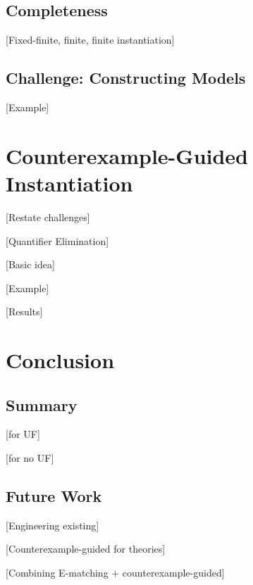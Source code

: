 \documentclass[oribibl]{llncs}
\begin{document}
\subsection{Completeness}

[Fixed-finite, finite, finite instantiation]

\subsection{Challenge: Constructing Models}

[Example]

\section{Counterexample-Guided Instantiation}
\label{sec:cegqi}

[Restate challenges]

[Quantifier Elimination]

[Basic idea]

[Example]

[Results]

\section{Conclusion}
\label{sec:conclusion}

\subsection{Summary}
[for UF]

[for no UF]

\subsection{Future Work}

[Engineering existing]

[Counterexample-guided for theories]

[Combining E-matching + counterexample-guided]



\end{document}
